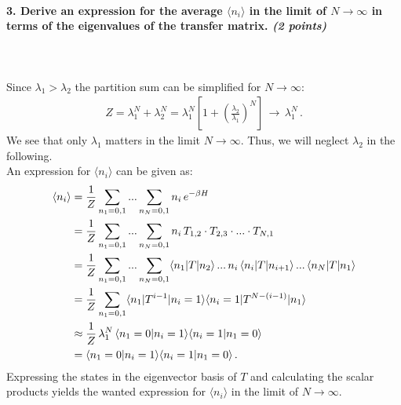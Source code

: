 \paragraph{3. Derive an expression for the 
    average $\langle n_i\rangle$ in the limit 
    of $N\to\infty$ in terms of the 
    eigenvalues of the transfer matrix.
    \textit{(2 points)}
} \ \\
\\
Since $\lambda_1>\lambda_2$ the partition sum can be simplified for $N\to\infty$:
\begin{align}
	Z = \lambda_1^N + \lambda_2^N
	= \lambda_1^N \left[1+\left(\frac{\lambda_2}{\lambda_1}\right)^N\right] \,
	\longrightarrow \, \lambda_1^N \,.
\end{align}
We see that only $\lambda_1$ matters in the limit $N\to\infty$. Thus, we will 
neglect $\lambda_2$ in the following. \\
An expression for $\langle n_i\rangle$ can be given as:
\begin{align}
	\langle n_i\rangle &= \frac{1}{Z} \sum_{n_1=0,1}...\sum_{n_N=0,1}
	n_i \, e^{-\beta H} \notag \\
	&= \frac{1}{Z} \sum_{n_1=0,1} ... \sum_{n_N=0,1} n_i \,
	T_{1,2} \cdot T_{2,3} \cdot ... \cdot T_{N,1} \notag \\
	&= \frac{1}{Z} \sum_{n_1=0,1} ... \sum_{n_N=0,1}
	\langle n_1 \vert T \vert n_2 \rangle \,
	... \, n_i \, \langle n_i \vert T \vert n_{i+1} \rangle \, ... \,
	\langle n_N \vert T \vert n_1 \rangle \notag \\
	&= \frac{1}{Z} \sum_{n_1=0,1}
	\langle n_1 \vert T^{i-1} \vert n_i=1 \rangle
	\langle n_i=1 \vert T^{N-(i-1)} \vert n_1 \rangle \notag \\
	&\approx \frac{1}{Z} \, \lambda_1^N \,
	\langle n_1=0 \vert n_i=1 \rangle
	\langle n_i=1 \vert n_1=0 \rangle \notag \\
	&= \langle n_1=0 \vert n_i=1 \rangle
	\langle n_i=1 \vert n_1=0 \rangle \,.
\end{align}
Expressing the states in the eigenvector basis of $T$ and calculating 
the scalar products yields the wanted expression for $\langle n_i\rangle$ 
in the limit of $N\to\infty$.
